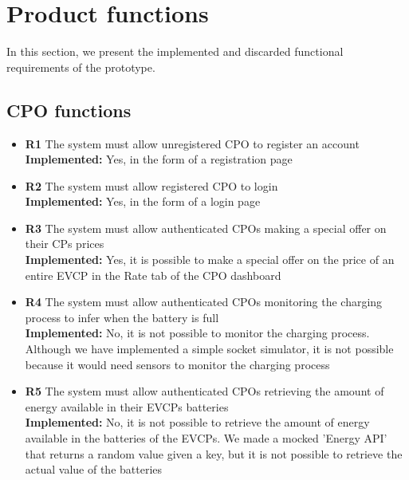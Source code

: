 \section{Product functions}
In this section, we present the implemented and discarded functional requirements of the prototype.

\subsection{CPO functions}

\begin{itemize}
    \item        \textbf{R1}  The system must allow unregistered CPO to register an account                                                                                            \\
          \textbf{Implemented:} Yes, in the form of a registration page
    \item        \textbf{R2}  The system must allow registered CPO to login                                                                                                            \\
          \textbf{Implemented:} Yes, in the form of a login page
    \item        \textbf{R3}  The system must allow authenticated CPOs making a special offer on their CPs prices                                                                      \\
          \textbf{Implemented:} Yes, it is possible to make a special offer on the price of an entire EVCP in the Rate tab of the CPO dashboard
    \item        \textbf{R4}  The system must allow authenticated CPOs monitoring the charging process to infer when the battery is full                                               \\
          \textbf{Implemented:} No, it is not possible to monitor the charging process. Although we have implemented a simple socket simulator, it is not possible because it would need sensors to monitor the charging process
    \item        \textbf{R5}  The system must allow authenticated CPOs retrieving the amount of energy available in their EVCPs batteries                                              \\
          \textbf{Implemented:} No, it is not possible to retrieve the amount of energy available in the batteries of the EVCPs. We made a mocked 'Energy API' that returns a random value given a key, but it is not possible to retrieve the actual value of the batteries

\end{itemize}
